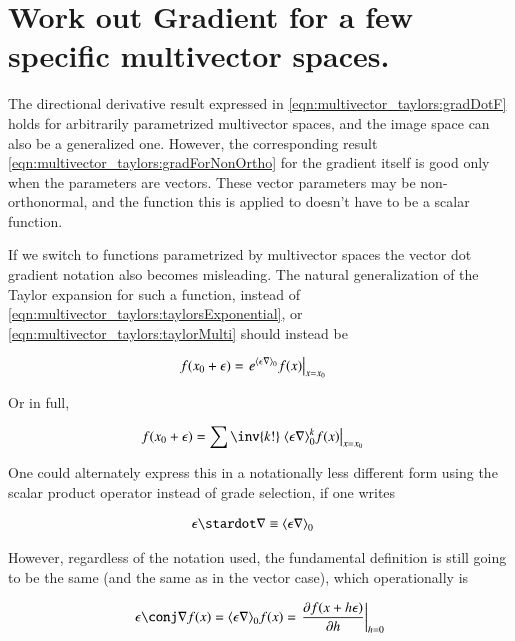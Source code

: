 \section{Work out Gradient for a few specific multivector spaces. }

The directional derivative result expressed in \ref{eqn:multivector_taylors:gradDotF} holds
for arbitrarily parametrized multivector spaces, and the image space
can also be a generalized one.  However, the corresponding result
\ref{eqn:multivector_taylors:gradForNonOrtho} for the gradient itself is good only when the
parameters are vectors.  These vector parameters may be non-orthonormal,
and the function
this is applied to doesn't have to be a scalar function.

If we switch to functions parametrized by multivector spaces the vector dot
gradient notation also becomes misleading.  The natural generalization
of the Taylor expansion for such a function, instead
of \ref{eqn:multivector_taylors:taylorsExponential}, or \ref{eqn:multivector_taylors:taylorMulti} should instead
be

\begin{align}\label{eqn:multivector_taylors:taylorsExponentialScalarProd}
f(x_0 + \epsilon) 
&= \left. e^{{\left\langle{{\epsilon \nabla}}\right\rangle}_{0}} f(x) \right\vert_{x=x_0} 
\end{align}

Or in full,

\begin{align}\label{eqn:multivector_taylors:taylorMultiScalarProd}
f(x_0 + \epsilon) 
&= \sum \inv{k!} \left. {\gpgradezero{\epsilon \grad}^k} f(x) \right\vert_{x=x_0}
\end{align}

One could alternately express this in a notationally less different form
using the scalar product operator instead of grade selection, if one writes

\begin{align*}
{\epsilon \stardot \grad} &\equiv \gpgradezero{\epsilon \grad} 
\end{align*}

However, regardless of the notation used, the fundamental definition 
is still going to be the same (and the same as in the vector case), which
operationally is

\begin{align*}
{\epsilon \conj \grad} f(x) = \gpgradezero{\epsilon \grad} f(x)
= \left. \PD{h}{f(x + h \epsilon)} \right\vert_{h=0}
\end{align*}

